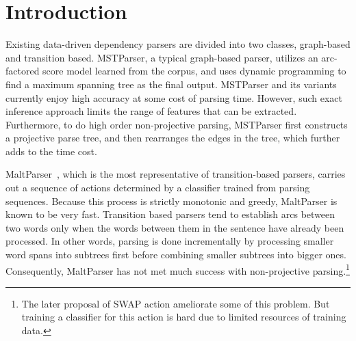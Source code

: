 \section{Introduction}

Existing data-driven dependency parsers are divided into two classes,
graph-based and transition based. MSTParser\cite{mcdonald2005non},
a typical graph-based parser, utilizes an arc-factored score model
learned from the corpus, and uses dynamic programming
to find a maximum spanning tree as the final output.
MSTParser and its variants currently enjoy high accuracy
at some cost of parsing time.
However, such exact inference approach limits
the range of features that can be extracted\cite{mcdonald2007characterizing}.
Furthermore, to do high order non-projective parsing, MSTParser
first constructs a projective parse tree,
and then rearranges the edges in the tree\cite{mcdonald2006online}, which further adds
to the time cost.


MaltParser~\cite{nivre2003efficient}, which is the most representative of
transition-based parsers, carries out a sequence of actions
determined by a classifier trained from parsing sequences.
Because this process is strictly monotonic and greedy,
MaltParser is known to be very fast.
Transition based parsers tend to establish arcs between two words only
when the words between them in the sentence have already been processed.
In other words, parsing is done incrementally by processing
smaller word spans into subtrees first before combining smaller subtrees
into bigger ones. Consequently, MaltParser has not met much success with
non-projective parsing.\footnote{The later proposal of SWAP action
ameliorate some of this problem. But training a classifier for this
action is hard due to limited resources of training data.}


